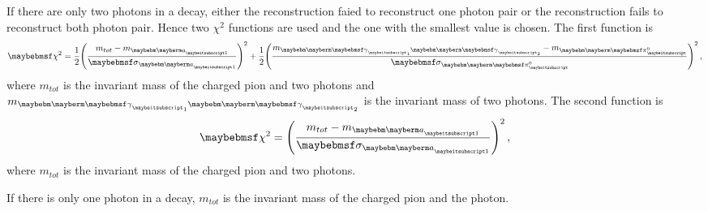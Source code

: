 If there are only two photons in a decay, either the reconstruction faied to reconstruct one photon pair or the reconstruction fails to reconstruct both photon pair. Hence two $\chi^2$ functions are used and the one with the smallest value is chosen. The first function is
\begin{equation}
\chi^{2} =\frac{1}{2} {\left(\frac{m_{tot} -  m_{\Pai}}{\sigma_{\Pai}}\right)}^{2} + \frac{1}{2} {\left(\frac{m_{\Pphoton_1 \Pphoton_2} -  m_{\Ppizero}}{\sigma_{\Ppizero}}\right)}^{2}  \,,
\label{eqn:tauA1TwoPhoton1}
\end{equation}
where $m_{tot}$ is the invariant mass of the charged pion and two photons and $m_{\Pphoton_1 \Pphoton_2}$ is the invariant mass of two photons. The second function is
\begin{equation}
\chi^{2} = {\left(\frac{m_{tot} -  m_{\Pai}}{\sigma_{\Pai}}\right)}^{2} \,,
\label{eqn:tauA1TwoPhoton2}
\end{equation}
where $m_{tot}$ is the invariant mass of the charged pion and two photons.


If there is only one photon in a decay,  $m_{tot}$ is the invariant mass of the charged pion and the photon.


